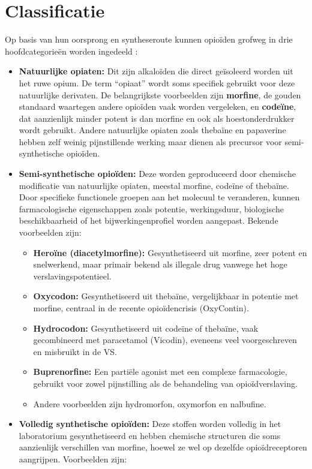 \documentclass[11pt, a4paper]{report} %
\begin{document}
\section{Classificatie}
Op basis van hun oorsprong en syntheseroute kunnen opioïden grofweg in drie hoofdcategorieën worden ingedeeld \parencite{SciELO2020Opioids}:
\begin{itemize}
    \item \textbf{Natuurlijke opiaten:} Dit zijn alkaloïden die direct geïsoleerd worden uit het ruwe opium. De term \enquote{opiaat} wordt soms specifiek gebruikt voor deze natuurlijke derivaten. De belangrijkste voorbeelden zijn \textbf{morfine}, de gouden standaard waartegen andere opioïden vaak worden vergeleken, en \textbf{codeïne}, dat aanzienlijk minder potent is dan morfine en ook als hoestonderdrukker wordt gebruikt. Andere natuurlijke opiaten zoals thebaïne en papaverine hebben zelf weinig pijnstillende werking maar dienen als precursor voor semi-synthetische opioïden.
    \item \textbf{Semi-synthetische opioïden:} Deze worden geproduceerd door chemische modificatie van natuurlijke opiaten, meestal morfine, codeïne of thebaïne. Door specifieke functionele groepen aan het molecuul te veranderen, kunnen farmacologische eigenschappen zoals potentie, werkingsduur, biologische beschikbaarheid of het bijwerkingenprofiel worden aangepast. Bekende voorbeelden zijn:
        \begin{itemize}
            \item \textbf{Heroïne (diacetylmorfine):} Gesynthetiseerd uit morfine, zeer potent en snelwerkend, maar primair bekend als illegale drug vanwege het hoge verslavingspotentieel.
            \item \textbf{Oxycodon:} Gesynthetiseerd uit thebaïne, vergelijkbaar in potentie met morfine, centraal in de recente opioïdencrisis (OxyContin).
            \item \textbf{Hydrocodon:} Gesynthetiseerd uit codeïne of thebaïne, vaak gecombineerd met paracetamol (Vicodin), eveneens veel voorgeschreven en misbruikt in de VS.
            \item \textbf{Buprenorfine:} Een partiële agonist met een complexe farmacologie, gebruikt voor zowel pijnstilling als de behandeling van opioïdverslaving.
            \item Andere voorbeelden zijn hydromorfon, oxymorfon en nalbufine.
        \end{itemize}
    \item \textbf{Volledig synthetische opioïden:} Deze stoffen worden volledig in het laboratorium gesynthetiseerd en hebben chemische structuren die soms aanzienlijk verschillen van morfine, hoewel ze wel op dezelfde opioïdreceptoren aangrijpen. Voorbeelden zijn:

\end{itemize}
\end{document}
